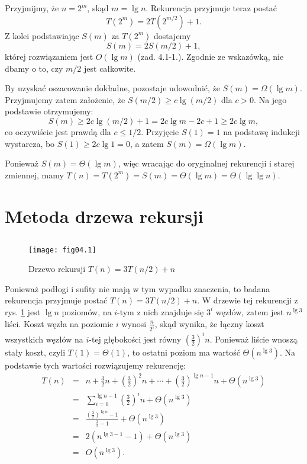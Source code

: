 \subsection{} %
Przyjmijmy, że $n=2^m$, skąd $m=\lg n$. Rekurencja przyjmuje teraz postać
\[
	T(2^m)=2T\left(2^{m/2}\right)+1.
\]
Z kolei podstawiając $S(m)$ za $T(2^m)$ dostajemy
\[
	S(m) = 2S(m/2)+1,
\]
której rozwiązaniem jest $O(\lg m)$ (zad. 4.1-1.). Zgodnie ze wskazówką, nie dbamy o to, czy $m/2$ jest całkowite.

By uzyskać oszacowanie dokładne, pozostaje udowodnić, że $S(m)=\Omega(\lg m)$. Przyjmujemy zatem założenie, że $S(m/2)\ge c\lg(m/2)$ dla $c>0$. Na jego podstawie otrzymujemy:
\[
	S(m)\ge 2c\lg(m/2)+1 = 2c\lg m-2c+1\ge 2c\lg m,
\]
co oczywiście jest prawdą dla $c\le 1/2$. Przyjęcie $S(1)=1$ na podstawę indukcji wystarcza, bo $S(1)\ge 2c\lg 1=0$, a zatem $S(m)=\Omega(\lg m)$.

Ponieważ $S(m)=\Theta(\lg m)$, więc wracając do oryginalnej rekurencji i starej zmiennej, mamy $T(n)=T(2^m)=S(m)=\Theta(\lg m)=\Theta(\lg\lg n)$.

\section{Metoda drzewa rekursji}

\subsection{} %
\begin{figure}[h]
	\begin{center}
		\texttt{[image: fig04.1]}
	\end{center}
	\caption{Drzewo rekursji $T(n)=3T(n/2)+n$} \label{fig:4.2-1}
\end{figure}
Ponieważ podłogi i sufity nie mają w tym wypadku znaczenia, to badana rekurencja przyjmuje postać $T(n)=3T(n/2)+n$. W drzewie tej rekurencji z rys. \ref{fig:4.2-1} jest $\lg n$ poziomów, na $i$-tym z nich znajduje się $3^i$ węzłów, zatem jest $n^{\lg 3}$ liści. Koszt węzła na poziomie $i$ wynosi $\frac{n}{2^i}$, skąd wynika, że łączny koszt wszystkich węzłów na $i$-tej głębokości jest równy $\left(\frac{3}{2}\right)^in$. Ponieważ liście wnoszą stały koszt, czyli $T(1)=\Theta(1)$, to ostatni poziom ma wartość $\Theta\left(n^{\lg 3}\right)$. Na podstawie tych wartości rozwiązujemy rekurencję:
\begin{eqnarray*}
	T(n) &=& n+\frac{3}{2}n+\left(\frac{3}{2}\right)^2n+\cdots+\left(\frac{3}{2}\right)^{\lg n-1}n+\Theta\left(n^{\lg 3}\right) \\
	&=& \sum_{i=0}^{\lg n-1}\left(\frac{3}{2}\right)^in+\Theta\left(n^{\lg 3}\right) \\
	&=& \frac{\left(\frac{3}{2}\right)^{\lg n}-1}{\frac{3}{2}-1}+\Theta\left(n^{\lg 3}\right) \\
	&=& 2\left(n^{\lg 3-1}-1\right)+\Theta\left(n^{\lg 3}\right) \\
	&=& O\left(n^{\lg 3}\right).
\end{eqnarray*}

